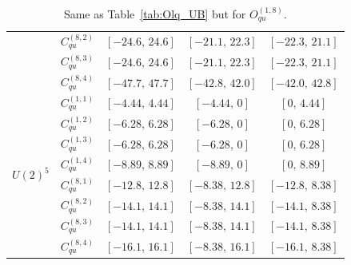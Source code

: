 \begin{table}[htbp]
{\begin{tabular}{ccccc}
        & $C_{qu}^{(8,2)}$ & $[-24.6,\, 24.6]$ & $[-21.1,\, 22.3]$ & $[-22.3,\, 21.1]$ \\
        & $C_{qu}^{(8,3)}$ & $[-24.6,\, 24.6]$ & $[-21.1,\, 22.3]$ & $[-22.3,\, 21.1]$ \\
        & $C_{qu}^{(8,4)}$ & $[-47.7,\, 47.7]$ & $[-42.8,\, 42.0]$ & $[-42.0,\, 42.8]$ \\
    \midrule
    \multirow{8}{*}{$U(2)^5$}
        & $C_{qu}^{(1,1)}$ & $[-4.44,\, 4.44]$ & $[-4.44,\, 0]$    & $[0,\, 4.44]$    \\
        & $C_{qu}^{(1,2)}$ & $[-6.28,\, 6.28]$ & $[-6.28,\, 0]$    & $[0,\, 6.28]$    \\
        & $C_{qu}^{(1,3)}$ & $[-6.28,\, 6.28]$ & $[-6.28,\, 0]$    & $[0,\, 6.28]$    \\
        & $C_{qu}^{(1,4)}$ & $[-8.89,\, 8.89]$ & $[-8.89,\, 0]$    & $[0,\, 8.89]$    \\
        & $C_{qu}^{(8,1)}$ & $[-12.8,\, 12.8]$ & $[-8.38,\, 12.8]$ & $[-12.8,\, 8.38]$ \\
        & $C_{qu}^{(8,2)}$ & $[-14.1,\, 14.1]$ & $[-8.38,\, 14.1]$ & $[-14.1,\, 8.38]$ \\
        & $C_{qu}^{(8,3)}$ & $[-14.1,\, 14.1]$ & $[-8.38,\, 14.1]$ & $[-14.1,\, 8.38]$ \\
        & $C_{qu}^{(8,4)}$ & $[-16.1,\, 16.1]$ & $[-8.38,\, 16.1]$ & $[-16.1,\, 8.38]$ \\
    \bottomrule
\end{tabular}}
\caption{Same as Table~\ref{tab:Olq_UB} but for $O_{qu}^{(1,8)}$.}
\label{tab:Oqu_UB}
\end{table}

